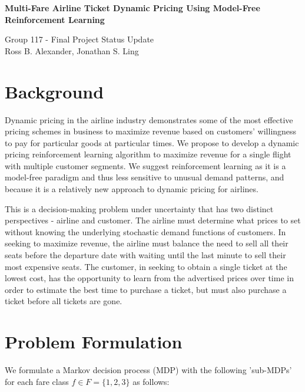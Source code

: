 \documentclass[10pt,letterpaper]{article}
\begin{document}

\begin{center}
\textbf{\LARGE Multi-Fare Airline Ticket Dynamic Pricing Using Model-Free Reinforcement Learning}

{\Small Group 117 - Final Project Status Update \\ \Small Ross B. Alexander, Jonathan S. Ling}
\end{center}

\begin{multicols*}{2}

\section*{Background}
Dynamic pricing in the airline industry demonstrates some of the most effective pricing schemes in business to maximize revenue based on customers' willingness to pay for particular goods at particular times. We propose to develop a dynamic pricing reinforcement learning algorithm to maximize revenue for a single flight with multiple customer segments. We suggest reinforcement learning as it is a model-free paradigm and thus less sensitive to unusual demand patterns, and because it is a relatively new approach to dynamic pricing for airlines.

This is a decision-making problem under uncertainty that has two distinct perspectives - airline and customer. The airline must determine what prices to set without knowing the underlying stochastic demand functions of customers. In seeking to maximize revenue, the airline must balance the need to sell all their seats before the departure date with waiting until the last minute to sell their most expensive seats. The customer, in seeking to obtain a single ticket at the lowest cost, has the opportunity to learn from the advertised prices over time in order to estimate the best time to purchase a ticket, but must also purchase a ticket before all tickets are gone.


\section*{Problem Formulation}
We formulate a Markov decision process (MDP) with the following 'sub-MDPs' for each fare class $f \in F = \{ 1,2,3 \}$ as follows:


\end{multicols*}
\end{document}
